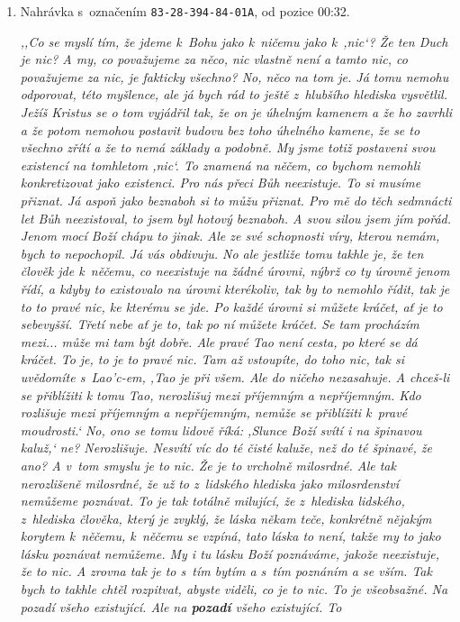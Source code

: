 \begin{enumerate}
{}

\item{%
Nahrávka s~označením \texttt{83-28-394-84-01A}, od pozice 00:32.

\textit{%
,,Co se myslí tím, že jdeme k~Bohu jako k~ničemu jako k~,nic`? Že ten Duch je
nic? A my, co považujeme za něco, nic vlastně není a tamto nic, co považujeme
za nic, je fakticky všechno? No, něco na tom je. Já tomu nemohu odporovat, této
myšlence, ale já bych rád to ještě z~hlubšího hlediska vysvětlil. Ježíš Kristus
se o tom vyjádřil tak, že on je úhelným kamenem a že ho zavrhli a že potom
nemohou postavit budovu bez toho úhelného kamene, že se to všechno zřítí a že to
nemá základy a podobně. My jsme totiž postaveni svou existencí na tomhletom
,nic`. To znamená na něčem, co bychom nemohli konkretizovat jako existenci. Pro
nás přeci Bůh neexistuje. To si musíme přiznat. Já aspoň jako beznaboh si to
můžu přiznat. Pro mě do těch sedmnácti let Bůh neexistoval, to jsem byl hotový
beznaboh. A svou silou jsem jím pořád. Jenom mocí Boží chápu to jinak. Ale ze
své schopnosti víry, kterou nemám, bych to nepochopil. Já vás obdivuju. No ale
jestliže tomu takhle je, že ten člověk jde k~něčemu, co neexistuje na žádné
úrovni, nýbrž co ty úrovně jenom řídí, a kdyby to existovalo na úrovni
kterékoliv, tak by to nemohlo řídit, tak je to to pravé nic, ke kterému se jde.
Po každé úrovni si můžete kráčet, ať je to sebevyšší. Třetí nebe ať je to, tak
po ní můžete kráčet. Se tam procházím mezi... může mi tam být dobře. Ale pravé
Tao není cesta, po které se dá kráčet. To je, to je to pravé nic. Tam až
vstoupíte, do toho nic, tak si uvědomíte s~Lao'c-em, ,Tao je při všem. Ale do
ničeho nezasahuje. A chceš-li se přiblížiti k tomu Tao, nerozlišuj mezi
příjemným a nepříjemným. Kdo rozlišuje mezi příjemným a nepříjemným, nemůže se
přiblížiti k~pravé moudrosti.` No, ono se tomu lidově říká: ,Slunce Boží svítí i na
špinavou kaluž,` ne? Nerozlišuje. Nesvítí víc do té
čisté kaluže, než do té špinavé, že ano? A v~tom smyslu je to nic. Že je to
vrcholně milosrdné. Ale tak nerozlišeně milosrdné, že už to z~lidského hlediska
jako milosrdenství nemůžeme poznávat. To je tak totálně milující, že z~hlediska
lidského, z~hlediska člověka, který je zvyklý, že láska někam teče, konkrétně
nějakým korytem k~něčemu, k~něčemu se vzpíná, tato láska to není, takže my to
jako lásku poznávat nemůžeme. My i tu lásku Boží poznáváme, jakože neexistuje,
že to nic. A zrovna tak je to s~tím bytím a s~tím poznáním a se vším. Tak bych
to takhle chtěl rozpitvat, abyste viděli, co je to nic. To je všeobsažné.
Na pozadí všeho existující. Ale na \textbf{pozadí} všeho existující. To
}}
\end{enumerate}
